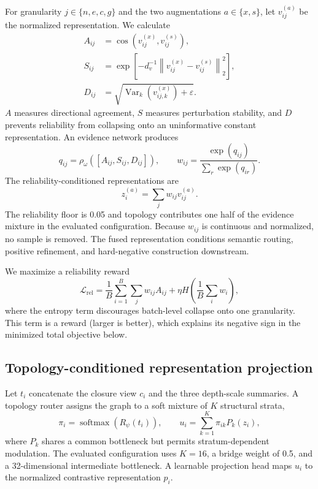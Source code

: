 \documentclass[10pt,twocolumn]{article}
\newcommand{\norm}[1]{\left\lVert #1\right\rVert}
\begin{document}
For granularity $j\in\{n,e,c,g\}$ and the two augmentations $a\in\{x,s\}$, let $v_{ij}^{(a)}$ be the normalized representation. We calculate
\begin{align}
A_{ij}&=\cos\!\left(v_{ij}^{(x)},v_{ij}^{(s)}\right),\\
S_{ij}&=\exp\!\left[-d_v^{-1}\norm{v_{ij}^{(x)}-v_{ij}^{(s)}}_2^2\right],\\
D_{ij}&=\sqrt{\operatorname{Var}_{k}\left(v_{ij,k}^{(x)}\right)+\varepsilon}.
\end{align}
$A$ measures directional agreement, $S$ measures perturbation stability, and $D$ prevents reliability from collapsing onto an uninformative constant representation. An evidence network produces
\begin{equation}
q_{ij}=\rho_\omega([A_{ij},S_{ij},D_{ij}]),\qquad
w_{ij}=\frac{\exp(q_{ij})}{\sum_{r}\exp(q_{ir})}.
\end{equation}
The reliability-conditioned representations are
\begin{equation}
\label{eq:fusion}
z_i^{(a)}=\sum_jw_{ij}v_{ij}^{(a)}.
\end{equation}
The reliability floor is 0.05 and topology contributes one half of the evidence mixture in the evaluated configuration. Because $w_{ij}$ is continuous and normalized, no sample is removed. The fused representation conditions semantic routing, positive refinement, and hard-negative construction downstream.

We maximize a reliability reward
\begin{equation}
\label{eq:relreward}
\mathcal L_{\mathrm{rel}}=
\frac{1}{B}\sum_{i=1}^{B}\sum_j w_{ij}A_{ij}
+\eta H\!\left(\frac{1}{B}\sum_iw_i\right),
\end{equation}
where the entropy term discourages batch-level collapse onto one granularity. This term is a reward (larger is better), which explains its negative sign in the minimized total objective below.

\subsection{Topology-conditioned representation projection}

Let $t_i$ concatenate the closure view $c_i$ and the three depth-scale summaries. A topology router assigns the graph to a soft mixture of $K$ structural strata,
\begin{equation}
\pi_i=\operatorname{softmax}(R_\psi(t_i)),\qquad
u_i=\sum_{k=1}^{K}\pi_{ik}P_k(z_i),
\end{equation}
where $P_k$ shares a common bottleneck but permits stratum-dependent modulation. The evaluated configuration uses $K=16$, a bridge weight of 0.5, and a 32-dimensional intermediate bottleneck. A learnable projection head maps $u_i$ to the normalized contrastive representation $p_i$.
\end{document}
